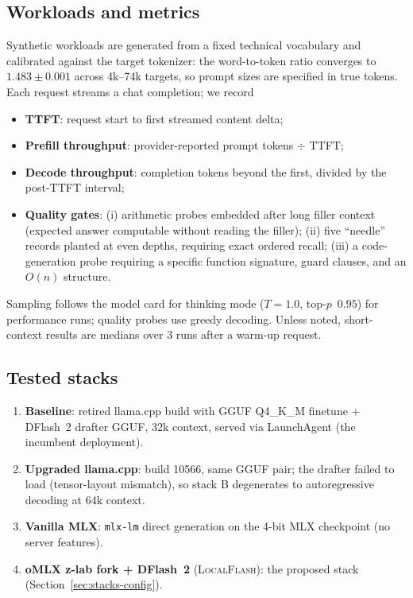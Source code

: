 \documentclass[11pt]{article}
\newcommand{\system}{\textsc{LocalFlash}}
\newcommand{\dflash}{DFlash~2}
\newcommand{\omlx}{oMLX}
\begin{document}
\subsection{Workloads and metrics}
Synthetic workloads are generated from a fixed technical vocabulary and
calibrated against the target tokenizer: the word-to-token ratio converges to
$1.483 \pm 0.001$ across 4k--74k targets, so prompt sizes are specified in
true tokens. Each request streams a chat completion; we record
\begin{itemize}
\item \textbf{TTFT}: request start to first streamed content delta;
\item \textbf{Prefill throughput}: provider-reported prompt tokens $\div$ TTFT;
\item \textbf{Decode throughput}: completion tokens beyond the first, divided
by the post-TTFT interval;
\item \textbf{Quality gates}: (i) arithmetic probes embedded after long filler
context (expected answer computable without reading the filler);
(ii) five ``needle'' records planted at even depths, requiring exact ordered
recall; (iii) a code-generation probe requiring a specific function signature,
guard clauses, and an $O(n)$ structure.
\end{itemize}
Sampling follows the model card for thinking mode ($T{=}1.0$, top-$p$~$0.95$)
for performance runs; quality probes use greedy decoding. Unless noted,
short-context results are medians over 3 runs after a warm-up request.

\subsection{Tested stacks}
\label{sec:stacks}
\begin{enumerate}
\item[\textbf{A.}] \textbf{Baseline}: retired llama.cpp build with
GGUF Q4\_K\_M finetune + \dflash{} drafter GGUF, 32k context, served via
LaunchAgent (the incumbent deployment).
\item[\textbf{B.}] \textbf{Upgraded llama.cpp}: build 10566, same GGUF pair;
the drafter failed to load (tensor-layout mismatch), so stack B degenerates to
autoregressive decoding at 64k context.
\item[\textbf{C.}] \textbf{Vanilla MLX}: \texttt{mlx-lm} direct generation on
the 4-bit MLX checkpoint (no server features).
\item[\textbf{D.}] \textbf{\omlx{} z-lab fork + \dflash{}} (\system{}):
the proposed stack (Section~\ref{sec:stacks-config}).
\end{enumerate}
\end{document}
